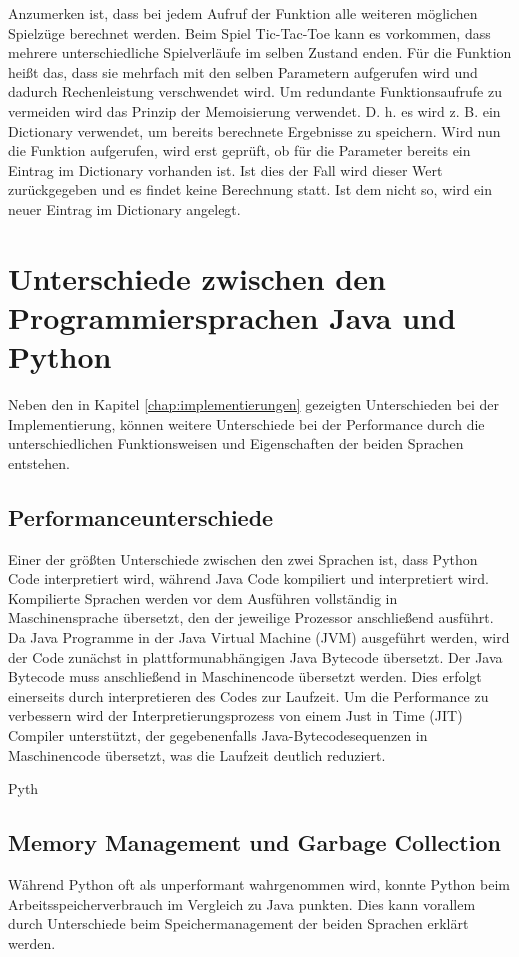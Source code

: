 Anzumerken ist, dass bei jedem Aufruf der Funktion  alle weiteren möglichen Spielzüge berechnet werden. 
Beim Spiel Tic-Tac-Toe kann es vorkommen, dass mehrere unterschiedliche Spielverläufe im selben Zustand enden. 
Für die Funktion  heißt das, dass sie mehrfach mit den selben Parametern aufgerufen wird und dadurch 
Rechenleistung verschwendet wird. Um redundante Funktionsaufrufe zu vermeiden wird das Prinzip der Memoisierung 
verwendet. D. h. es wird z. B. ein Dictionary verwendet, um bereits berechnete Ergebnisse zu speichern. Wird nun 
die Funktion  aufgerufen, wird erst geprüft, ob für die Parameter bereits ein Eintrag im Dictionary 
vorhanden ist. Ist dies der Fall wird dieser Wert zurückgegeben und es findet keine Berechnung statt. Ist dem nicht 
so, wird ein neuer Eintrag im Dictionary angelegt.

\section{Unterschiede zwischen den Programmiersprachen Java und Python}
Neben den in Kapitel \ref{chap:implementierungen} gezeigten Unterschieden bei der Implementierung, können weitere Unterschiede 
bei der Performance durch die unterschiedlichen Funktionsweisen und Eigenschaften der beiden Sprachen entstehen.

\subsection{Performanceunterschiede}
Einer der größten Unterschiede zwischen den zwei Sprachen ist, dass Python Code interpretiert wird, während Java Code kompiliert und 
interpretiert wird. Kompilierte Sprachen werden vor dem Ausführen vollständig in Maschinensprache übersetzt, den der 
jeweilige Prozessor anschließend ausführt. Da Java Programme in der Java Virtual Machine (JVM) ausgeführt werden, wird 
der Code zunächst in plattformunabhängigen Java Bytecode übersetzt. Der Java Bytecode muss anschließend in Maschinencode 
übersetzt werden. Dies erfolgt einerseits durch interpretieren des Codes zur Laufzeit. Um die Performance zu verbessern 
wird der Interpretierungsprozess von einem Just in Time (JIT) Compiler unterstützt, der gegebenenfalls Java-Bytecodesequenzen 
in Maschinencode übersetzt, was die Laufzeit deutlich reduziert.\autocite[Vgl.][]{Aboullaite.31.8.2017}

Pyth


\subsection{Memory Management und Garbage Collection}
Während Python oft als unperformant wahrgenommen wird, konnte Python beim Arbeitsspeicherverbrauch im Vergleich 
zu Java punkten. Dies kann vorallem durch Unterschiede beim Speichermanagement der beiden Sprachen erklärt werden. 

